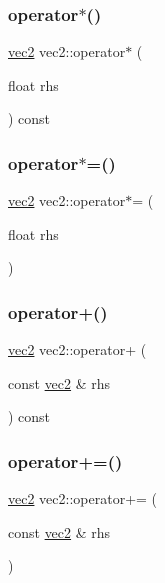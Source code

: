 \mbox{\label{structvec2_a68f9765fd1eac99396be0958e15a908c}} 
\subsubsection{\texorpdfstring{operator$\ast$()}{operator*()}}
{\footnotesize\ttfamily \hyperlink{structvec2}{vec2} vec2\+::operator$\ast$ (\begin{DoxyParamCaption}\item[{float}]{rhs }\end{DoxyParamCaption}) const}

\mbox{\label{structvec2_aaeef9a4b188905735d1c7996dafb77cb}} 
\subsubsection{\texorpdfstring{operator$\ast$=()}{operator*=()}}
{\footnotesize\ttfamily \hyperlink{structvec2}{vec2} vec2\+::operator$\ast$= (\begin{DoxyParamCaption}\item[{float}]{rhs }\end{DoxyParamCaption})}

\mbox{\label{structvec2_a8ddc4154c0d2688aecf156a3d3ebc7c7}} 
\subsubsection{\texorpdfstring{operator+()}{operator+()}}
{\footnotesize\ttfamily \hyperlink{structvec2}{vec2} vec2\+::operator+ (\begin{DoxyParamCaption}\item[{const \hyperlink{structvec2}{vec2} \&}]{rhs }\end{DoxyParamCaption}) const}

\mbox{\label{structvec2_ad0cc0e5f6a564ec00824bd35fe112c46}} 
\subsubsection{\texorpdfstring{operator+=()}{operator+=()}}
{\footnotesize\ttfamily \hyperlink{structvec2}{vec2} vec2\+::operator+= (\begin{DoxyParamCaption}\item[{const \hyperlink{structvec2}{vec2} \&}]{rhs }\end{DoxyParamCaption})}

